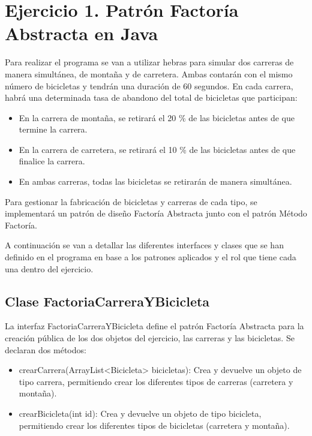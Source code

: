\documentclass{article}
\begin{document}
\section{Ejercicio 1. Patrón Factoría Abstracta en Java}
Para realizar el programa se van a utilizar hebras para simular dos carreras de manera simultánea, de montaña y de carretera. Ambas contarán con el mismo número de bicicletas y tendrán una duración de 60 segundos.  En cada carrera, habrá una determinada tasa de abandono del total de bicicletas que participan:

\begin{itemize}
    \item {En la carrera de montaña, se retirará el 20 \% de las bicicletas antes de que termine la carrera.}
    \item {En la carrera de carretera, se retirará el 10 \% de las bicicletas antes de que finalice la carrera.}
    \item {En ambas carreras, todas las bicicletas se retirarán de manera simultánea.}

\end{itemize}

Para gestionar la fabricación de bicicletas y carreras de cada tipo, se implementará un patrón de diseño Factoría Abstracta junto con el patrón Método Factoría.
\vspace{0.2cm}


A continuación se van a detallar las diferentes interfaces y clases que se han definido en el programa en base a los patrones aplicados y el rol que tiene cada una dentro del ejercicio.

\subsection{Clase FactoriaCarreraYBicicleta}
La interfaz FactoriaCarreraYBicicleta define el patrón Factoría Abstracta para la creación pública de los dos objetos del ejercicio, las carreras y las bicicletas. Se declaran dos métodos:
\begin{itemize}
    \item {crearCarrera(ArrayList\textless{}Bicicleta\textgreater{} bicicletas)}: Crea y devuelve un objeto de tipo carrera, permitiendo crear los diferentes tipos de carreras (carretera y montaña).
    \item {crearBicicleta(int id)}: Crea y devuelve un objeto de tipo bicicleta, permitiendo crear los diferentes tipos de bicicletas (carretera y montaña).
\end{itemize}
\end{document}
